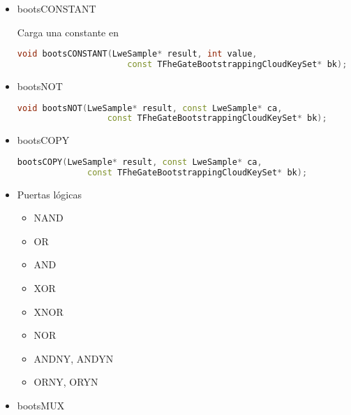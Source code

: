 \begin{itemize}
  \item bootsCONSTANT
  
  Carga una constante en 

  \begin{lstlisting}[language=c++]
    void bootsCONSTANT(LweSample* result, int value,
                      const TFheGateBootstrappingCloudKeySet* bk);
  \end{lstlisting}

  \item bootsNOT

  \begin{lstlisting}[language=c++]
    void bootsNOT(LweSample* result, const LweSample* ca,
                  const TFheGateBootstrappingCloudKeySet* bk);
  \end{lstlisting}

  \item bootsCOPY

  \begin{lstlisting}[language=c++]
    bootsCOPY(LweSample* result, const LweSample* ca,
              const TFheGateBootstrappingCloudKeySet* bk);
  \end{lstlisting}

  \item Puertas lógicas

  \begin{itemize}
    \item NAND

    \item OR

    \item AND

    \item XOR

    \item XNOR

    \item NOR

    \item ANDNY, ANDYN

    \item ORNY, ORYN

  \end{itemize}

  \item bootsMUX
\end{itemize}
